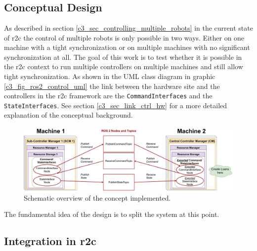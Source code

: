 \chapter{}
\label{sec:concept}

\section{Conceptual Design}
As described in section \ref{c3_sec_controlling_multiple_robots} in the current state of \gls{r2c} the control of multiple robots is only possible in two ways. Either on one machine with a tight synchronization or on multiple machines with no significant synchronization at all. The goal of this work is to test whether it is possible in the \gls{r2c} context to run multiple controllers on multiple machines and still allow tight synchronization.\newline
As shown in the UML class diagram in graphic \ref{c3_fig_ros2_control_uml} the link between the hardware site and the controllers in the \gls{r2c} framework are the \texttt{CommandInterfaces} and the \texttt{StateInterfaces}. See section \ref{c3_sec_link_ctrl_hw} for a more detailed explanation of the conceptual background.\newline
\begin{figure}[htbp]
	\centering

 \includegraphics[width=1\textwidth]{Figures/C4/simple_concept.drawio.pdf}
	\caption{Schematic overview of the concept implemented.}
	\label{c4_fig_simple_concept}
\end{figure}
The fundamental idea of the design is to split the system at this point. 




\section{Integration in \gls{r2c}}

